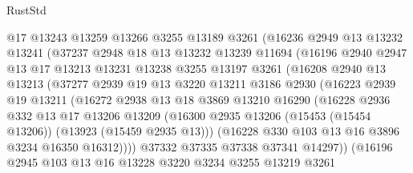 \begin{lexlean}{RustStd}
\begin{coremodule}
                @17
                @13243
                @13259
                @13266
                @3255
                @13189
                @3261
                (@16236
                  @2949
                  @13
                  @13232
                  @13241
                  (@37237
                    @2948
                    @18
                    @13
                    @13232
                    @13239
                    @11694
                    (@16196
                      @2940
                      @2947
                      @13
                      @17
                      @13213
                      @13231
                      @13238
                      @3255
                      @13197
                      @3261
                      (@16208
                        @2940
                        @13
                        @13213
                        (@37277
                          @2939
                          @19
                          @13
                          @3220
                          @13211
                          @3186
                          @2930
                          (@16223
                            @2939
                            @19
                            @13211
                            (@16272
                              @2938
                              @13
                              @18
                              @3869
                              @13210
                              @16290
                              (@16228
                                @2936
                                @332
                                @13
                                @17
                                @13206
                                @13209
                                (@16300
                                  @2935
                                  @13206
                                  (@15453 (@15454 @13206))
                                  (@13923 (@15459 @2935 @13)))
                                (@16228 @330 @103 @13 @16 @3896 @3234 @16350 @16312))))
                          @37332
                          @37335
                          @37338
                          @37341
                          @14297))
                      (@16196
                        @2945
                        @103
                        @13
                        @16
                        @13228
                        @3220
                        @3234
                        @3255
                        @13219
                        @3261

\end{coremodule}
\end{lexlean}
